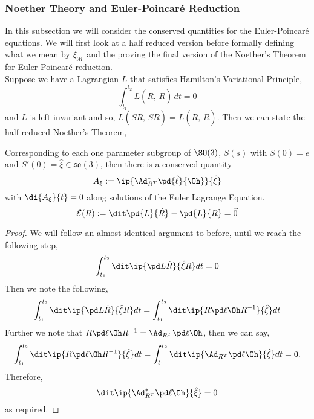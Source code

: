 \subsubsection{Noether Theory and Euler-Poincar\'e Reduction}
In this subsection we will consider the conserved quantities for the Euler-Poincar\'e equations. We will first look at a half reduced version before formally defining what we mean by $\xi_\mathcal{M}$ and the proving the final version of the Noether's Theorem for Euler-Poincar\'e reduction.\\

\noindent
Suppose we have a Lagrangian $L$ that satisfies Hamilton's Variational Principle,
$$ \int_{t_1}^{t_2} L(R,\,\dot R)\,dt = 0 $$
and $L$ is left-invariant and so, $L(SR,\,S\dot R) = L(R,\,\dot R)$. Then we can state the half reduced Noether's Theorem,
\begin{nthm}
  Corresponding to each one parameter subgroup of $\SO(3)$, $S(s)$ with $S(0)= e$ and $S'(0) = \hat\xi \in \mathfrak{so}(3)$, then there is a conserved quantity
  $$ A_\xi := \ip{\Ad^*_{R^T}\pd{\hat\ell}{\Oh}}{\hat\xi} $$
  with $\di{A_\xi}{t} = 0$ along solutions of the Euler Lagrange Equation.
  $$ \mathcal{E}(R) := \dit\pd{L}{\dot R} - \pd{L}{R} = \vec 0 $$
\end{nthm}
\begin{proof}
  We will follow an almost identical argument to before, until we reach the following step,
  \begin{align*}
    \int_{t_1}^{t_2} \dit \ip{\pd L {\dot R}}{\hat\xi R}dt = 0
  \end{align*}
  \noindent
  Then we note the following,
  $$ \int_{t_1}^{t_2} \dit \ip{\pd L {\dot R}}{\hat\xi R}dt = \int_{t_1}^{t_2} \dit \ip{R\pd \ell {\Oh}R^{-1}}{\hat\xi}dt $$
  Further we note that $R\pd \ell {\Oh}R^{-1} = \Ad_{R^T}\pd \ell \Oh$, then we can say,
  $$ \int_{t_1}^{t_2} \dit \ip{R\pd \ell {\Oh}R^{-1}}{\hat\xi}dt = \int_{t_1}^{t_2} \dit \ip{\Ad_{R^T}\pd \ell \Oh}{\hat\xi}dt = 0. $$
  Therefore,
  $$ \dit \ip{\Ad_{R^T}^*\pd \ell \Oh}{\hat\xi} = 0 $$
  as required.
\end{proof}

